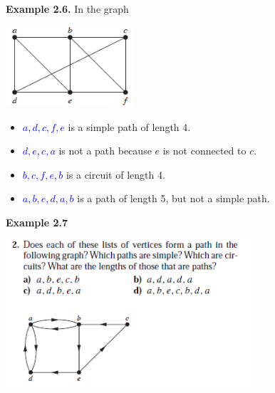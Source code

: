 \documentclass[aspectratio=169]{beamer}
\providecommand{\Blue}[1]{\textcolor{blue}{#1}}
\begin{document}
\begin{frame}[plain]{}
 
    {\bf Example 2.6.} In the graph
      \begin{center}
        \includegraphics[height=3cm]{./img/lecture2-fig5.png}
      \end{center}
      \pause 
      \begin{itemize}[<+->]
       \item \Blue{$a, d, c, f, e$} is a simple path of length 4.
       \item  \Blue{$d, e, c, a$} is not a path because $e$ is not connected to $c$.
       \item \Blue{$b, c, f, e, b$} is a circuit of length 4.
       \item \Blue{$a, b, e, d, a, b$} is a path of length 5, but not a simple path.
       \end{itemize}
 
\end{frame}

\begin{frame}[plain]{}
 
 {\bf Example 2.7} 
    \begin{center}
        \includegraphics[height=5.5cm]{./img/lecture2-fig6.png}
      \end{center}  
\end{frame}
\end{document}

